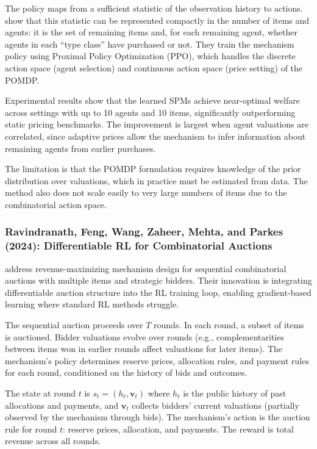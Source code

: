 The policy maps from a sufficient statistic of the observation history to actions. \citet{BreroEtAl2021} show that this statistic can be represented compactly in the number of items and agents: it is the set of remaining items and, for each remaining agent, whether agents in each ``type class'' have purchased or not. They train the mechanism policy using Proximal Policy Optimization (PPO), which handles the discrete action space (agent selection) and continuous action space (price setting) of the POMDP.

Experimental results show that the learned SPMs achieve near-optimal welfare across settings with up to 10 agents and 10 items, significantly outperforming static pricing benchmarks. The improvement is largest when agent valuations are correlated, since adaptive prices allow the mechanism to infer information about remaining agents from earlier purchases.

The limitation is that the POMDP formulation requires knowledge of the prior distribution over valuations, which in practice must be estimated from data. The method also does not scale easily to very large numbers of items due to the combinatorial action space.


\subsubsection{Ravindranath, Feng, Wang, Zaheer, Mehta, and Parkes (2024): Differentiable RL for Combinatorial Auctions}

\citet{RavindranathEtAl2024} address revenue-maximizing mechanism design for sequential combinatorial auctions with multiple items and strategic bidders. Their innovation is integrating differentiable auction structure into the RL training loop, enabling gradient-based learning where standard RL methods struggle.

The sequential auction proceeds over $T$ rounds. In each round, a subset of items is auctioned. Bidder valuations evolve over rounds (e.g., complementarities between items won in earlier rounds affect valuations for later items). The mechanism's policy determines reserve prices, allocation rules, and payment rules for each round, conditioned on the history of bids and outcomes.

The state at round $t$ is $s_t = (h_t, \mathbf{v}_t)$ where $h_t$ is the public history of past allocations and payments, and $\mathbf{v}_t$ collects bidders' current valuations (partially observed by the mechanism through bids). The mechanism's action is the auction rule for round $t$: reserve prices, allocation, and payments. The reward is total revenue across all rounds.

